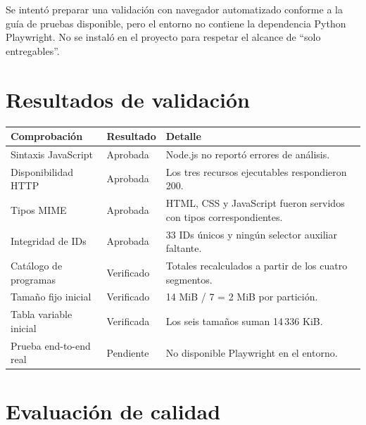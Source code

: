 \documentclass[11pt,a4paper]{article}
\begin{document}
Se intentó preparar una validación con navegador automatizado conforme a la guía de
pruebas disponible, pero el entorno no contiene la dependencia Python Playwright.
No se instaló en el proyecto para respetar el alcance de ``solo entregables''.

\section{Resultados de validación}

\begin{longtable}{p{}p{}p{}}
\toprule
\textbf{Comprobación} & \textbf{Resultado} & \textbf{Detalle}\\
\midrule
\endhead
Sintaxis JavaScript & Aprobada & Node.js no reportó errores de análisis.\\
Disponibilidad HTTP & Aprobada & Los tres recursos ejecutables respondieron 200.\\
Tipos MIME & Aprobada & HTML, CSS y JavaScript fueron servidos con tipos correspondientes.\\
Integridad de IDs & Aprobada & 33 IDs únicos y ningún selector auxiliar faltante.\\
Catálogo de programas & Verificado & Totales recalculados a partir de los cuatro segmentos.\\
Tamaño fijo inicial & Verificado & 14 MiB / 7 = 2 MiB por partición.\\
Tabla variable inicial & Verificada & Los seis tamaños suman 14\,336 KiB.\\
Prueba end-to-end real & Pendiente & No disponible Playwright en el entorno.\\
\bottomrule
\end{longtable}

\section{Evaluación de calidad}
\end{document}
